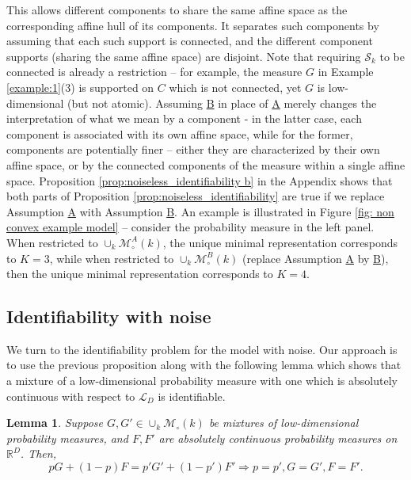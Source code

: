 \documentclass[bj,authoryear]{imsart}
\theoremstyle{plain}
\newtheorem{lemma}{Lemma}[section]
\theoremstyle{remark}
\def\bbR{\mathbb{R}}
\def\cL{\mathcal{L}}
\def\cM{\mathcal{M}}
\def\cS{\mathcal{S}}
\begin{document}
This allows different components to share the same affine space as the corresponding affine hull of its components. It separates such components by assuming that each such support is connected, and the different component supports (sharing the same affine space) are disjoint. Note that requiring $\cS_k$ to be connected is already a restriction -- for example, the measure $G$ in Example \ref{example:1}(3) is supported on $C$ which is not connected, yet $G$ is low-dimensional (but not atomic). Assuming \hyperref[assume:B]{B} in place of \hyperref[assume:A]{A} merely changes the interpretation of what we mean by a component - in the latter case, each component is associated with its own affine space, while for the former, components are potentially finer -- either they are characterized by their own affine space, or by the connected components of the measure within a single affine space. Proposition \ref{prop:noiseless_identifiability b} in the Appendix shows that both parts of Proposition \ref{prop:noiseless_identifiability} are true if we replace Assumption \hyperref[assume:A]{A} with Assumption \hyperref[assume:B]{B}. An example is illustrated in Figure \ref{fig: non convex example model} -- consider the probability measure in the left panel. When restricted to $\cup_k\cM_\circ^A(k)$, the unique minimal representation corresponds to $K=3$, while when restricted to $\cup_k \cM_\circ^B(k)$ (replace Assumption \hyperref[assume:A]{A} by \hyperref[assume:B]{B}), then the unique minimal representation corresponds to $K=4$.

\subsection{Identifiability with noise}

We turn to the identifiability problem for the model with noise. Our approach is to use the previous proposition along with the following lemma 
which shows that a mixture of a low-dimensional probability measure with one which is absolutely continuous with respect to $\cL_D$ is identifiable.

\begin{lemma}\label{lemma:identify_lower_dim_abs_cont}
        Suppose $G, G'\in \cup_k\cM_\circ(k)$ be mixtures of low-dimensional probability measures, and $F, F'$ are absolutely continuous probability measures on $\bbR^D$. Then,
        $$p G + (1-p)F = p' G' + (1-p')F' \Rightarrow p=p', G=G',F=F'.$$
    \end{lemma}
\end{document}
